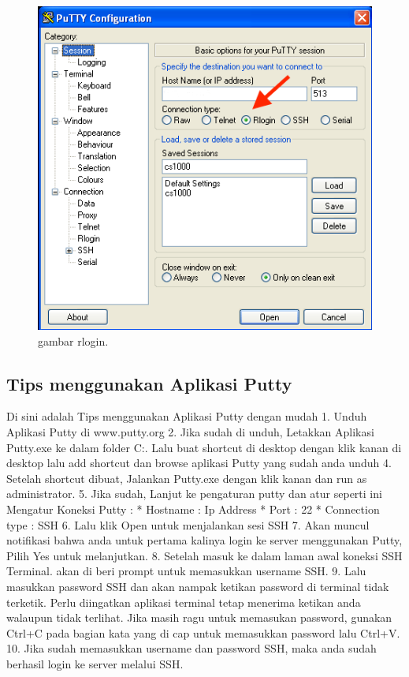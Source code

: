 \begin{figure}[ht]
\centerline{\includegraphics[width=1\textwidth]{figures/rlogin.png}}
\caption{gambar rlogin.}
\label{rlogin}
\end{figure}

\subsection {Tips menggunakan Aplikasi Putty}
Di sini adalah Tips menggunakan Aplikasi Putty dengan mudah
1. Unduh Aplikasi Putty di www.putty.org
2. Jika sudah di unduh, Letakkan Aplikasi Putty.exe ke dalam folder C:. Lalu buat shortcut di desktop dengan klik kanan di desktop lalu add shortcut dan browse aplikasi Putty yang sudah anda unduh
4. Setelah shortcut dibuat, Jalankan Putty.exe dengan klik kanan dan run as administrator.
5. Jika sudah, Lanjut ke pengaturan putty dan atur seperti ini
Mengatur Koneksi Putty :
* Hostname 			: Ip Address
* Port 				: 22
* Connection type 	: SSH
6. Lalu klik Open untuk menjalankan sesi SSH
7. Akan muncul notifikasi bahwa anda untuk pertama kalinya login ke server menggunakan Putty, Pilih Yes untuk melanjutkan.
8. Setelah masuk ke dalam laman awal koneksi SSH Terminal. akan di beri prompt untuk memasukkan username SSH.
9. Lalu masukkan password SSH dan akan nampak ketikan password di terminal tidak terketik. Perlu diingatkan aplikasi terminal tetap menerima ketikan anda walaupun tidak terlihat. Jika masih ragu untuk memasukan password, gunakan Ctrl+C pada bagian kata yang di cap untuk memasukkan password lalu Ctrl+V.
10. Jika sudah memasukkan username dan password SSH, maka anda sudah berhasil login ke server melalui SSH.

